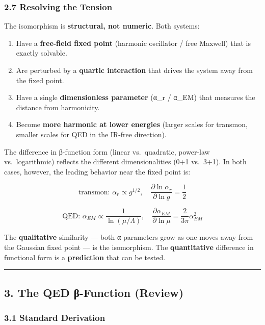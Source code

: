 \documentclass[
]{article}
\providecommand{\tightlist}{%
  \setlength{\itemsep}{0pt}\setlength{\parskip}{0pt}}
\begin{document}
\subsubsection{2.7 Resolving the Tension}\label{resolving-the-tension}

The isomorphism is \textbf{structural, not numeric}. Both systems:

\begin{enumerate}
\def\labelenumi{\arabic{enumi}.}
\tightlist
\item
  Have a \textbf{free-field fixed point} (harmonic oscillator / free
  Maxwell) that is exactly solvable.
\item
  Are perturbed by a \textbf{quartic interaction} that drives the system
  away from the fixed point.
\item
  Have a single \textbf{dimensionless parameter} (α\_r / α\_EM) that
  measures the distance from harmonicity.
\item
  Become \textbf{more harmonic at lower energies} (larger scales for
  transmon, smaller scales for QED in the IR-free direction).
\end{enumerate}

The difference in β-function form (linear vs.~quadratic, power-law
vs.~logarithmic) reflects the different dimensionalities (0+1 vs.~3+1).
In both cases, however, the leading behavior near the fixed point is:

\[\text{transmon: } \alpha_r \propto g^{1/2}, \quad \frac{\partial\ln\alpha_r}{\partial\ln g} = \frac{1}{2}\]

\[\text{QED: } \alpha_{EM} \propto \frac{1}{\ln(\mu/\Lambda)}, \quad \frac{\partial\alpha_{EM}}{\partial\ln\mu} = \frac{2}{3\pi}\alpha_{EM}^2\]

The \textbf{qualitative} similarity --- both α parameters grow as one
moves away from the Gaussian fixed point --- is the isomorphism. The
\textbf{quantitative} difference in functional form is a
\textbf{prediction} that can be tested.

\begin{center}\rule{0.5\linewidth}{0.5pt}\end{center}

\subsection{3. The QED β-Function
(Review)}\label{the-qed-ux3b2-function-review}

\subsubsection{3.1 Standard Derivation}\label{standard-derivation}
\end{document}
